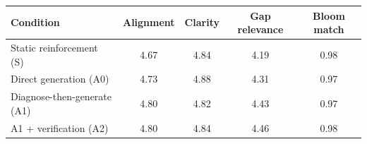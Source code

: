\begin{tabular}{lcccc}
\toprule
Condition & Alignment & Clarity & Gap relevance & Bloom match \\
\midrule
Static reinforcement (S) & 4.67 & 4.84 & 4.19 & 0.98 \\
Direct generation (A0) & 4.73 & 4.88 & 4.31 & 0.97 \\
Diagnose-then-generate (A1) & 4.80 & 4.82 & 4.43 & 0.97 \\
A1 + verification (A2) & 4.80 & 4.84 & 4.46 & 0.98 \\
\bottomrule
\end{tabular}
